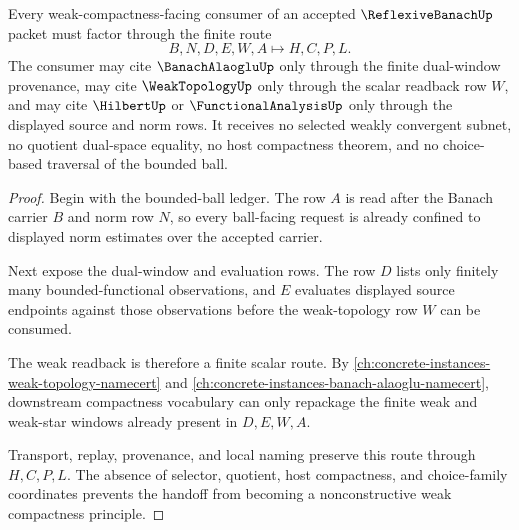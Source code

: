 \begin{theorem}
\label{thm:reflexive-banach-weak-compactness-handoff}
Every weak-compactness-facing consumer of an accepted $\ReflexiveBanachUp$ packet must factor through the finite route
$$
B,N,D,E,W,A \longmapsto H,C,P,L .
$$
The consumer may cite $\BanachAlaogluUp$ only through the finite dual-window provenance, may cite $\WeakTopologyUp$ only through the scalar readback row $W$, and may cite $\HilbertUp$ or $\FunctionalAnalysisUp$ only through the displayed source and norm rows. It receives no selected weakly convergent subnet, no quotient dual-space equality, no host compactness theorem, and no choice-based traversal of the bounded ball.
\end{theorem}
\begin{proof}
Begin with the bounded-ball ledger. The row $A$ is read after the Banach carrier $B$ and norm row $N$, so every ball-facing request is already confined to displayed norm estimates over the accepted carrier.

Next expose the dual-window and evaluation rows. The row $D$ lists only finitely many bounded-functional observations, and $E$ evaluates displayed source endpoints against those observations before the weak-topology row $W$ can be consumed.

The weak readback is therefore a finite scalar route. By \autoref{ch:concrete-instances-weak-topology-namecert} and \autoref{ch:concrete-instances-banach-alaoglu-namecert}, downstream compactness vocabulary can only repackage the finite weak and weak-star windows already present in $D,E,W,A$.

Transport, replay, provenance, and local naming preserve this route through $H,C,P,L$. The absence of selector, quotient, host compactness, and choice-family coordinates prevents the handoff from becoming a nonconstructive weak compactness principle.
\end{proof}



